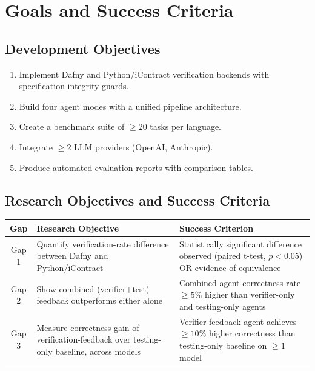 \documentclass[11pt,a4paper]{article}
\begin{document}
\section{Goals and Success Criteria}

\subsection{Development Objectives}
\begin{enumerate}[noitemsep]
    \item Implement Dafny and Python/iContract verification backends with specification integrity guards.
    \item Build four agent modes with a unified pipeline architecture.
    \item Create a benchmark suite of $\geq$20 tasks per language.
    \item Integrate $\geq$2 LLM providers (OpenAI, Anthropic).
    \item Produce automated evaluation reports with comparison tables.
\end{enumerate}

\subsection{Research Objectives and Success Criteria}

\begin{table}[H]
\centering
\small
\begin{tabularx}{\textwidth}{|c|X|X|}
\hline
\textbf{Gap} & \textbf{Research Objective} & \textbf{Success Criterion} \\
\hline
Gap 1 & Quantify verification-rate difference between Dafny and Python/iContract & Statistically significant difference observed (paired t-test, $p < 0.05$) OR evidence of equivalence \\
\hline
Gap 2 & Show combined (verifier+test) feedback outperforms either alone & Combined agent correctness rate $\geq 5\%$ higher than verifier-only and testing-only agents \\
\hline
Gap 3 & Measure correctness gain of verification-feedback over testing-only baseline, across models & Verifier-feedback agent achieves $\geq 10\%$ higher correctness than testing-only baseline on $\geq 1$ model \\
\hline
\end{tabularx}
\end{table}
\end{document}

